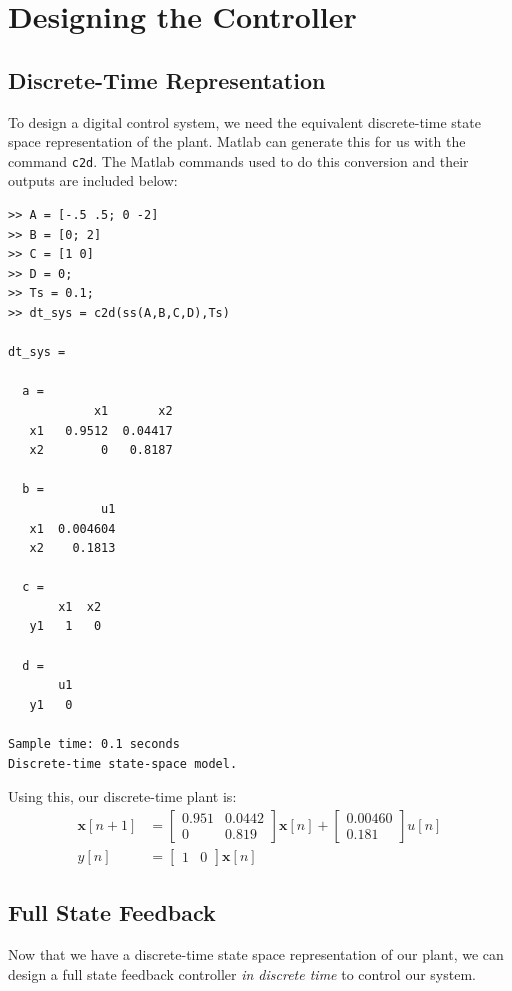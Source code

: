\documentclass[11pt]{article}
\begin{document}
\section*{Designing the Controller}
\subsection*{Discrete-Time Representation}
To design a digital control system, we need the equivalent discrete-time state space representation of the plant.
Matlab can generate this for us with the command {\tt c2d}.
The Matlab commands used to do this conversion and their outputs are included below:
\small
\begin{verbatim}
>> A = [-.5 .5; 0 -2]
>> B = [0; 2]
>> C = [1 0]
>> D = 0;
>> Ts = 0.1;
>> dt_sys = c2d(ss(A,B,C,D),Ts)

dt_sys =
 
  a = 
            x1       x2
   x1   0.9512  0.04417
   x2        0   0.8187
 
  b = 
             u1
   x1  0.004604
   x2    0.1813
 
  c = 
       x1  x2
   y1   1   0
 
  d = 
       u1
   y1   0
 
Sample time: 0.1 seconds
Discrete-time state-space model.
\end{verbatim}\normalsize
Using this, our discrete-time plant is:
\begin{align*}
\mathbf{x}[n+1] &= 
  \begin{bmatrix}
    0.951 & 0.0442\\
    0     & 0.819
  \end{bmatrix}
  \mathbf{x}[n] + 
  \begin{bmatrix}
    0.00460 \\ 0.181
  \end{bmatrix}u[n]\\
y[n] &= 
  \begin{bmatrix}
    1 & 0
  \end{bmatrix}
  \mathbf{x}[n]
\end{align*}

\subsection*{Full State Feedback}
Now that we have a discrete-time state space representation of our plant, we can design a full state feedback controller \emph{in discrete time} to control our system.
\end{document}
